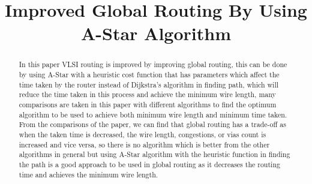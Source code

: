 \documentclass[conference]{IEEEtran}
\begin{document}

\title{Improved Global Routing By Using A-Star Algorithm\\}


\author{
}


\maketitle


\begin{abstract}
    In this paper VLSI routing is improved by improving global routing, this can be done by using A-Star with a heuristic cost function that has parameters which affect the time taken by the router instead of Dijkstra's algorithm in finding path, which will reduce the time taken in this process and achieve the minimum wire length, many comparisons are taken in this paper with different algorithms to find the optimum algorithm to be used to achieve both minimum wire length and minimum time taken. From the comparisons of the paper, we can find that global routing has a trade-off as when the taken time is decreased, the wire length, congestions, or vias count is increased and vice versa, so there is no algorithm which is better from the other algorithms in general but using A-Star algorithm with the heuristic function in finding the path is a good approach to be used in global routing as it decreases the routing time and achieves the minimum wire length.
\end{abstract}
\end{document}
